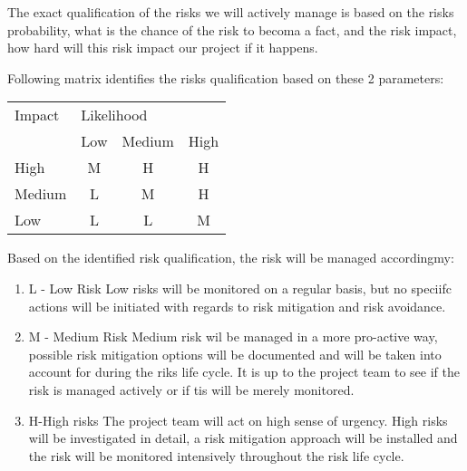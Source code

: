 The exact qualification of the risks we will actively manage is based on the risks probability, what is the chance of the risk to becoma a fact, and the risk impact, how hard will this risk impact our project if it happens.

Following matrix identifies the risks qualification based on these 2 parameters:


\begin{table}[h]
\centering
\begin{tabular}{lccc}
Impact & \multicolumn{3}{l}{Likelihood}                                                     \\
       & \multicolumn{1}{l}{Low}   & \multicolumn{1}{l}{Medium} & \multicolumn{1}{l}{High}  \\
High   & \cellcolor[HTML]{FFCB2F}M & \cellcolor[HTML]{FE0000}H  & \cellcolor[HTML]{FE0000}H \\
Medium & \cellcolor[HTML]{34FF34}L & \cellcolor[HTML]{FFCB2F}M  & \cellcolor[HTML]{FE0000}H \\
Low    & \cellcolor[HTML]{34FF34}L & \cellcolor[HTML]{34FF34}L  & \cellcolor[HTML]{FFC702}M
\end{tabular}
\end{table}

Based on the identified risk qualification, the risk will be managed accordingmy:
\begin{enumerate}
	\item L - Low Risk
	Low risks will be monitored on a regular basis, but no speciifc actions will be initiated with regards to risk mitigation and risk avoidance.
	\item M - Medium Risk
	Medium risk wil be managed in a more pro-active way, possible risk mitigation options will be documented and will be taken into account for during the riks life cycle. It is up to the project team to see if the risk is managed actively or if tis will be merely monitored.
	\item H-High risks
	The project team will act on high sense of urgency. High risks will be investigated in detail, a risk mitigation approach will be installed and the risk will be monitored intensively throughout the risk life cycle.
\end {enumerate}
 

